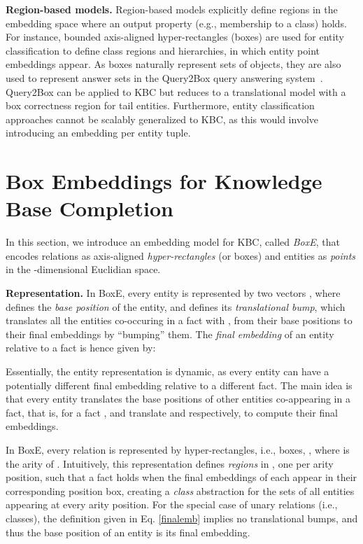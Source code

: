 \documentclass{article}
\begin{document}
\textbf{Region-based models.}
Region-based models explicitly define regions in the embedding space where an output property (e.g., membership to a class) holds. 
For instance, bounded axis-aligned hyper-rectangles (boxes) \cite{Box-ACL18,SubramanianC18,LiVZBM19} are used for entity classification to define class regions and hierarchies, in which entity point embeddings  appear. 
As boxes naturally represent sets of objects, they are also used to represent answer sets in the Query2Box query answering system~\cite{Ren20}. Query2Box can be applied to KBC but reduces to a translational model with a box correctness region for tail entities.
Furthermore, entity classification approaches cannot be scalably generalized to KBC, as this would involve introducing an embedding per entity tuple. 


\section{Box Embeddings for Knowledge Base Completion}
\label{sec:BoxE}
In this section, we introduce an embedding model for KBC, 
called \emph{BoxE}, that encodes relations as axis-aligned \emph{hyper-rectangles} (or boxes) and entities as \emph{points} in the -dimensional Euclidian space.

\textbf{Representation.} In BoxE, every entity  is represented by two vectors , where  defines the \emph{base position} of the entity, and  defines its \emph{translational bump}, which translates all the entities co-occuring in a fact with , from their base positions to their final embeddings by ``bumping'' them.
The \emph{final embedding} of an entity  relative to a fact  is hence given by: 


Essentially, the entity representation is dynamic, as every entity can have a potentially different final embedding relative to a different fact. The main idea is that every entity translates the base positions of other entities co-appearing in a fact, that is, for a fact ,  and  translate  and  respectively, to compute their final embeddings.


In BoxE, every relation  is represented by  hyper-rectangles, i.e., boxes, , where  is the arity of . 
Intuitively, this representation defines  \emph{regions} in , one per arity position, such that a fact  holds when the final embeddings of  each appear in their corresponding position box, creating a \emph{class} abstraction for the sets of all entities appearing at every arity position.
For the special case of unary relations (i.e., classes), the definition given in Eq. \ref{finalemb} implies no translational bumps, and thus the base  position of an entity is its final embedding.
\end{document}

